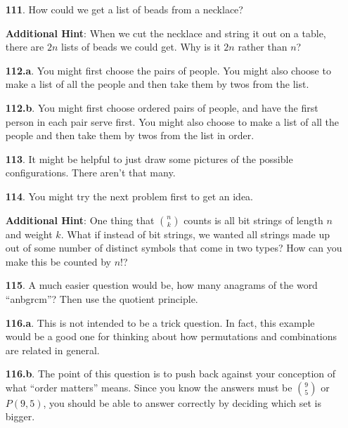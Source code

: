 \documentclass[10pt,]{book}
\theoremstyle{plain}
\theoremstyle{definition}
\theoremstyle{definition}
\theoremstyle{definition}
\numberwithin{equation}{chapter}
\begin{document}
\begin{itemize}[itemsep=1em]
\item[\textbf{111}.]\hypertarget{p-767}{}%
How could we get a list of beads from a necklace?%

\par\smallskip
\noindent\textbf{Additional Hint}: \hypertarget{p-768}{}%
When we cut the necklace and string it out on a table, there are \(2n\) lists of beads we could get. Why is it \(2n\) rather than \(n\)?%

\item[\textbf{112.a}.]\hypertarget{p-772}{}%
You might first choose the pairs of people. You might also choose to make a list of all the people and then take them by twos from the list.%

\item[\textbf{112.b}.]\hypertarget{p-776}{}%
You might first choose ordered pairs of people, and have the first person in each pair serve first. You might also choose to make a list of all the people and then take them by twos from the list in order.%

\item[\textbf{113}.]\hypertarget{p-780}{}%
It might be helpful to just draw some pictures of the possible configurations. There aren't that many.%

\item[\textbf{114}.]\hypertarget{p-784}{}%
You might try the next problem first to get an idea.%

\par\smallskip
\noindent\textbf{Additional Hint}: \hypertarget{p-785}{}%
One thing that \(\binom{n}{k}\) counts is all bit strings of length \(n\) and weight \(k\).  What if instead of bit strings, we wanted all strings made up out of some number of distinct symbols that come in two types?  How can you make this be counted by \(n!\)?%

\item[\textbf{115}.]\hypertarget{p-787}{}%
A much easier question would be, how many anagrams of the word ``anbgrcm''?  Then use the quotient principle.%

\item[\textbf{116.a}.]\hypertarget{p-791}{}%
This is not intended to be a trick question.  In fact, this example would be a good one for thinking about how permutations and combinations are related in general.%

\item[\textbf{116.b}.]\hypertarget{p-793}{}%
The point of this question is to push back against your conception of what ``order matters'' means.  Since you know the answers must be \(\binom{9}{5}\) or \(P(9,5)\), you should be able to answer correctly by deciding which set is bigger.%


\end{itemize}
\end{document}
